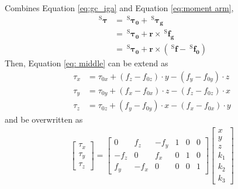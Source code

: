 \par\noindent
Combines Equation \ref{eq:gc_iga} and Equation \ref{eq:moment arm},
\begin{equation}
\label{eq: middle}
\begin{split}
\ ^\mathrm{S}\boldsymbol{\tau}	&=	\ ^\mathrm{S}\boldsymbol{\tau_0}		+\ ^\mathrm{S}\boldsymbol{\tau_g}			\\
					&= 	\ ^\mathrm{S}\boldsymbol{\tau_0}	 	+\boldsymbol{r} \times \ ^\mathrm{S}\!\boldsymbol{f_g}	\\
					&=  \ ^\mathrm{S}\boldsymbol{\tau_0}		+\boldsymbol{r}	\times \left( \ ^\mathrm{S}\!\boldsymbol{f} - \ ^\mathrm{S}\!\boldsymbol{f_0} \right) 
\end{split}
\end{equation}
Then, Equation \ref{eq: middle} can be extend as 
\begin{equation}
\begin{split}
\tau _{x}	&=	\tau _{0x} 	+ \left( f_z - f_{0z}\right) \cdot y - \left( f_y - f_{0y}\right) \cdot z\\
\tau _{y}	&=	\tau _{0y}	+ \left( f_x - f_{0x}\right) \cdot z - \left( f_z - f_{0z}\right) \cdot x\\
\tau _{z}	&=	\tau _{0z}	+ \left( f_y - f_{0y}\right) \cdot x - \left( f_x - f_{0x}\right) \cdot y 
\end{split}
\end{equation}
and be overwritten as
\begin{equation}\label{eq:matrix_mfrk}
\begin{split}
\begin{bmatrix}
\tau _x\\
\tau _y\\
\tau _z
\end{bmatrix}
=
\begin{bmatrix}
0		&f_z	&-f_y	&1	&0	&0\\
-f_z	&0		&f_x	&0	&1	&0\\
f_y		&-f_x	&0		&0	&0	&1
\end{bmatrix}
\begin{bmatrix}
x\\
y\\
z\\
k_1\\
k_2\\
k_3
\end{bmatrix}\\
\end{split}
\end{equation}
\par\noindent

